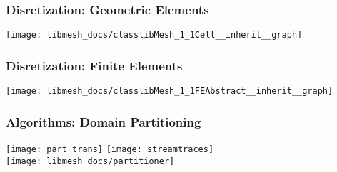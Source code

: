 





\frame
{
  \frametitle{Disretization: Geometric Elements}
  \begin{center}
    \texttt{[image: libmesh\_docs/classlibMesh\_1\_1Cell\_\_inherit\_\_graph]}
  \end{center}
}



\frame
{
  \frametitle{Disretization: Finite Elements}
  \begin{center}
    \texttt{[image: libmesh\_docs/classlibMesh\_1\_1FEAbstract\_\_inherit\_\_graph]}
  \end{center}
}



\frame
{
  \frametitle{Algorithms: Domain Partitioning}
  \begin{center}
    \texttt{[image: part\_trans]}
    \texttt{[image: streamtraces]} \\

    \texttt{[image: libmesh\_docs/partitioner]}
  \end{center}
}










